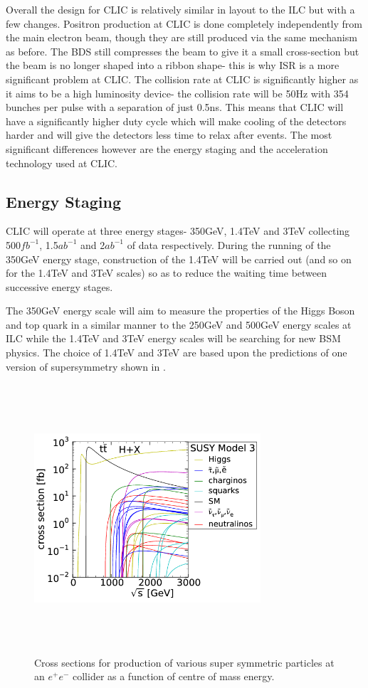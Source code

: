 Overall the design for \ac{CLIC} is relatively similar in layout to the \ac{ILC} but with a few changes. Positron production at \ac{CLIC} is done completely independently from the main electron beam, though they are still produced via the same mechanism as before. The \ac{BDS} still compresses the beam to give it a small cross-section but the beam is no longer shaped into a ribbon shape- this is why \ac{ISR} is a more significant problem at \ac{CLIC}. The collision rate at \ac{CLIC} is significantly higher as it aims to be a high luminosity device- the collision rate will be 50Hz with 354 bunches per pulse with a separation of just 0.5ns. This means that CLIC will have a significantly higher duty cycle which will make cooling of the detectors harder and will give the detectors less time to relax after events. The most significant differences however are the energy staging and the acceleration technology used at \ac{CLIC}.
\subsection{Energy Staging}
CLIC will operate at three energy stages- 350GeV, 1.4TeV and 3TeV collecting 500${fb^{-1}}$, 1.5${ab^{-1}}$ and 2${ab^{-1}}$ of data respectively. During the running of the 350GeV energy stage, construction of the 1.4TeV will be carried out (and so on for the 1.4TeV and 3TeV scales) so as to reduce the waiting time between successive energy stages.

The 350GeV energy scale will aim to measure the properties of the Higgs Boson and top quark in a similar manner to the 250GeV and 500GeV energy scales at \ac{ILC} while the 1.4TeV and 3TeV energy scales will be searching for new \ac{BSM} physics. The choice of 1.4TeV and 3TeV are based upon the predictions of one version of supersymmetry shown in .
\begin{figure}
  \centering
  \includegraphics[width=0.75\textwidth,height=10cm,keepaspectratio]{Experiments/fig/clicSS}
  \caption[Cross Sections For Super Symmetric Processes]{Cross sections for production of various super symmetric particles at an ${e^+e^-}$ collider as a function of centre of mass energy.}
  \label{Fig:SuperSym}
\end{figure}

